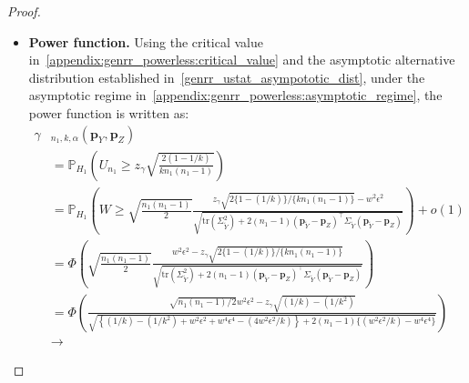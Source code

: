 \documentclass[twoside,11pt]{article}
\newcommand{\rvTwo}{Y}
\newcommand{\rvThree}{Z}
\newcommand{\alphabetSize}{k} %
\newcommand{\sampleSize}{n}
\newcommand{\probVec}{\mathbf{p}} %
\newcommand{\privacyParameter}{\alpha} %
\begin{document}
\begin{appendix}
\begin{proof}
\begin{itemize}
		\item \textbf{Power function.}
		Using the critical value in~\eqref{appendix:genrr_powerless:critical_value}
		and the asymptotic alternative distribution established in~\eqref{genrr_ustat_asympototic_dist}, 
		under the asymptotic regime in~\eqref{appendix:genrr_powerless:asymptotic_regime},
		the power function is written as:
		\begin{align*}
			\gamma&_{\sampleSize_1, \alphabetSize, \privacyParameter}
			(\probVec_\rvTwo,
			\probVec_\rvThree)
			\\&=
			\mathbb{P}_{H_1} \!
			\left(
			U_{n_1}
			\geq
			z_{\gamma}
			\sqrt{
				\frac{
					2(1 -  1/ \alphabetSize)}{
					\alphabetSize n_1(n_1-1)}
			}
			\right)
			\\&=
			\mathbb{P}_{H_1} \!
			\left(
			W
			\geq
			\sqrt{
				\frac{
					\sampleSize_1(\sampleSize_1-1)
				}{
					2
				} 
			}
			\frac{z_{\gamma}
				\sqrt{
					2\{1 - ( 1/ \alphabetSize) \}/ \{ \alphabetSize n_1(n_1-1)  \}
				}
				- w^2 \epsilon^2
			}{
				\sqrt{
					\mathrm{tr}(\Sigma_{\tilde{\rvTwo}}^2)
					+
					2(\sampleSize_1 - 1)
					(\probVec_{\tilde{\rvTwo}} - \probVec_\rvThree)^\top 
					\Sigma_{\tilde{\rvTwo}}
					(\probVec_{\tilde{\rvTwo}} - \probVec_\rvThree)	
				}
			}
			\right) + o(1)
			\\&=
			\Phi \!
			\left(
			\sqrt{
				\frac{
					\sampleSize_1(\sampleSize_1-1)
				}{
					2
				} 
			}
			\frac{
				w^2 \epsilon^2
				-
				z_{\gamma}
				\sqrt{
					2\{1 - ( 1/ \alphabetSize) \}/ \{ \alphabetSize n_1(n_1-1)  \}
				}
			}{
				\sqrt{
					\mathrm{tr}(\Sigma_{\tilde{\rvTwo}}^2)
					+
					2(\sampleSize_1 - 1)
					(\probVec_{\tilde{\rvTwo}} - \probVec_\rvThree)^\top 
					\Sigma_{\tilde{\rvTwo}}
					(\probVec_{\tilde{\rvTwo}} - \probVec_\rvThree)	
				}
			}
			\right)
			\\&=
			\Phi \!
			\left(
			\frac{
				\sqrt{
					\sampleSize_1(\sampleSize_1-1)
					/
					2
				}
				w^2 \epsilon^2
				-
				z_{\gamma}
				\sqrt{
					(1/\alphabetSize)
					-
					(1/\alphabetSize^2)
				}
			}{
				\sqrt{
					\left\{
					(1/\alphabetSize)
					-
					(1/\alphabetSize^2)
					+
					w^2 \epsilon^2
					+
					w^4 \epsilon^4
					-
					(4w^2 \epsilon^2/\alphabetSize)
					\right\}
					+
					2(\sampleSize_1 - 1)
					\bigl\{
					(w^2 \epsilon^2/\alphabetSize)
					-
					w^4 \epsilon^4
					\bigr\}	
				}
			}
			\right)
			\\ &\to

\end{align*}
\end{itemize}
\end{proof}
\end{appendix}
\end{document}
